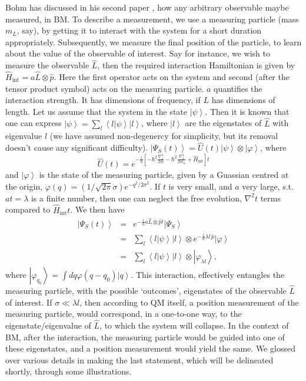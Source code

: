 Bohm has discussed in his second paper \cite{Bohm2}, how any arbitrary
observable maybe measured, in BM. To describe a measurement, we use
a measuring particle (mass $m_{L}$, say), by getting it to interact
with the system for a short duration appropriately. Subsequently,
we measure the final position of the particle, to learn about the
value of the observable of interest. Say for instance, we wish to
measure the observable $\hat{L}$, then the required interaction Hamiltonian
is given by $\hat{H}_{\text{int}}=a\hat{L}\otimes\hat{p}$. Here the
first operator acts on the system and second (after the tensor product
symbol) acts on the measuring particle. $a$ quantifies the interaction
strength. It has dimensions of frequency, if $L$ has dimensions of
length. Let us assume that the system in the state $\left|\psi\right\rangle $.
Then it is known that one can express $\left|\psi\right\rangle =\sum_{l}\left\langle l|\psi\right\rangle \left|l\right\rangle $,
where $\left|l\right\rangle $ are the eigenstates of $\hat{L}$ with
eigenvalue $l$ (we have assumed non-degenercy for simplicity, but
its removal doesn't cause any significant difficulty). $\left|\Psi_{S}(t)\right\rangle =\hat{U}(t)\left|\psi\right\rangle \otimes\left|\varphi\right\rangle $,
where 
\[
\hat{U}(t)=e^{-\frac{i}{\hbar}\left[-\hbar^{2}\frac{\nabla_{1}^{2}}{2m}-\hbar^{2}\frac{\nabla_{2}^{2}}{2m_{L}}+\hat{H}_{\text{int}}\right]t}
\]
 and $\left|\varphi\right\rangle $ is the state of the measuring
particle, given by a Guassian centred at the origin, $\varphi(q)=(1/\sqrt{2\pi}\sigma)e^{-q^{2}/2\sigma^{2}}$.
If $t$ is very small, and $a$ very large, s.t. $at=\lambda$ is
a finite number, then one can neglect the free evolution, $\nabla^{2}t$
terms compared to $\hat{H}_{\text{int}}t$. We then have 
\begin{eqnarray*}
\left|\Psi_{S}(t)\right\rangle  & = & e^{-\frac{i}{\hbar}a\hat{L}\otimes\hat{p}t}\left|\Psi_{S}\right\rangle \\
 & = & \sum_{l}\left\langle l|\psi\right\rangle \left|l\right\rangle \otimes e^{-\frac{i}{\hbar}\lambda l\,\hat{p}}\left|\varphi\right\rangle \\
 & = & \sum_{l}\left\langle l|\psi\right\rangle \left|l\right\rangle \otimes\left|\varphi_{\lambda l}\right\rangle ,
\end{eqnarray*}
where $\left|\varphi_{q_{0}}\right\rangle =\int dq\varphi(q-q_{0})\left|q\right\rangle $.
This interaction, effectively entangles the measuring particle, with
the possible `outcomes', eigenstates of the observable $\hat{L}$
of interest. If $\sigma\ll\lambda l$, then according to QM itself,
a position measurement of the measuring particle, would correspond,
in a one-to-one way, to the eigenstate/eigenvalue of $\hat{L}$, to
which the system will collapse. In the context of BM, after the interaction,
the measuring particle would be guided into one of these eigenstates,
and a position measurement would yield the same. We glossed over various
details in making the last statement, which will be delineated shortly,
through some illustrations. 


